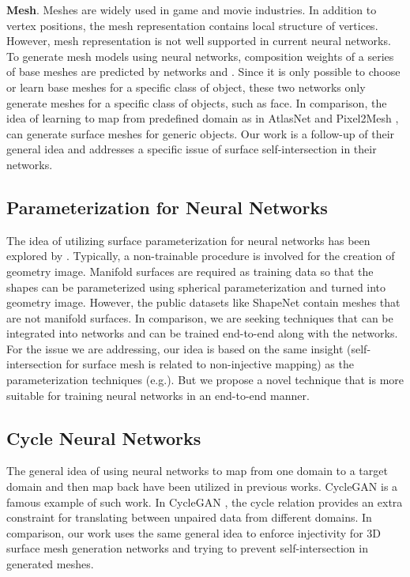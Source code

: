 \noindent\textbf{Mesh}.
Meshes are widely used in game and movie industries.
In addition to vertex positions, the mesh representation contains local structure of vertices. 
However, mesh representation is not well supported in current neural networks.
% 
To generate mesh models using neural networks, composition weights of a series of base meshes are predicted by networks \cite{img2mesh} and \cite{endface}. %
Since it is only possible to choose or learn base meshes for a specific class of object, these two networks only generate meshes for a specific class of objects, such as face.
%
In comparison, the idea of learning to map from predefined domain as in AtlasNet  \cite{atlasnet} and Pixel2Mesh \cite{pixel2mesh}, can generate surface meshes for generic objects. Our work is a follow-up of their general idea and addresses a specific issue of surface self-intersection in their networks.

\subsection{Parameterization for Neural Networks}
The idea of utilizing surface parameterization for neural networks has been explored by \cite{surfnet,geoimg}. 
Typically, a non-trainable procedure is involved for the creation of geometry image. 
Manifold surfaces are required as training data so that the shapes can be parameterized using spherical parameterization and turned into geometry image. However, the public datasets like ShapeNet \cite{shapenetdata} contain meshes that are not manifold surfaces. 
In comparison, we are seeking techniques that can be integrated into networks and can be trained end-to-end along with the networks. For the issue we are addressing, our idea is based on the same insight (self-intersection for surface mesh is related to non-injective mapping) as the parameterization techniques (e.g.\cite{provableplanarmapping,lifted_bijection,freeboundary,boundeddistortion,Liu_PP_2018}). But we propose a novel technique that is more suitable for training neural networks in an end-to-end manner. 

\subsection{Cycle Neural Networks}
The general idea of using neural networks to map from one domain to a target domain and then map back have been utilized in previous works. CycleGAN \cite{CycleGAN2017} is a famous example of such work. In CycleGAN \cite{CycleGAN2017}, the cycle relation provides an extra constraint for translating between unpaired data from different domains. In comparison, our work uses the same general idea to enforce injectivity for 3D surface mesh generation networks and trying to prevent self-intersection in generated meshes. 

